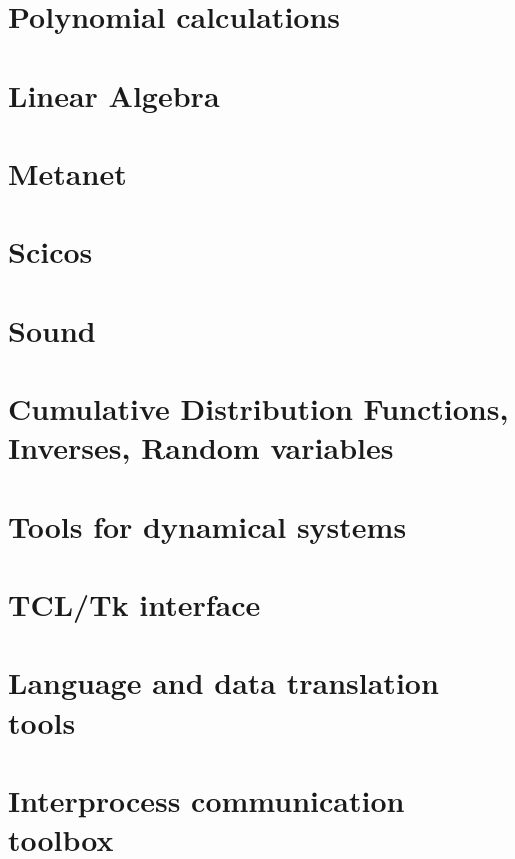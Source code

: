 \documentclass[11pt]{book}
\begin{document}
\chapter{Polynomial calculations}
        
\chapter{Linear Algebra}
        
\chapter{Metanet}
        
\chapter{Scicos} 
        
\chapter{Sound} 
        
\chapter{Cumulative Distribution Functions, Inverses, Random variables}
        
\chapter{Tools for dynamical systems}
        
\chapter{TCL/Tk interface}
        
\chapter{Language and data translation tools}
        
\chapter{Interprocess communication toolbox}
        
\printindex
\end{document}

